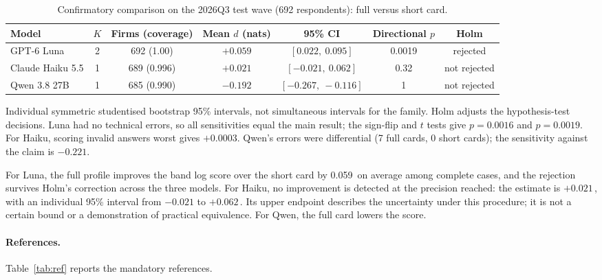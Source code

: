 \documentclass[11pt]{article}
\newcommand{\nats}{\,\text{nats}}
\begin{document}
\begin{table}[ht]
\centering
\begin{threeparttable}
\caption{Confirmatory comparison on the 2026Q3 test wave (692 respondents): full versus short card.}
\label{tab:main}
\small
\setlength{\tabcolsep}{3.5pt}
\begin{tabular*}{\textwidth}{@{\extracolsep{\fill}}lcccccc@{}}
\toprule
Model & $K$ & Firms (coverage) & Mean $d$ (nats) & 95\% CI & Directional $p$ & Holm\\
\midrule
GPT-6 Luna & 2 & 692 (1.00) & $+0.059$ & $[0.022,\ 0.095]$ & 0.0019 & rejected\\
Claude Haiku 5.5 & 1 & 689 (0.996) & $+0.021$ & $[-0.021,\ 0.062]$ & 0.32 & not rejected\\
Qwen 3.8 27B & 1 & 685 (0.990) & $-0.192$ & $[-0.267,\ -0.116]$ & 1 & not rejected\\
\bottomrule
\end{tabular*}
\begin{tablenotes}\footnotesize
\item Individual symmetric studentised bootstrap 95\% intervals, not simultaneous intervals for the family.
Holm adjusts the hypothesis-test decisions. Luna had no technical errors, so all sensitivities equal the main
result; the sign-flip and $t$ tests give $p=0.0016$ and $p=0.0019$. For Haiku, scoring invalid answers worst gives
$+0.0003$. Qwen's errors were differential (7 full cards, 0 short cards); the sensitivity against the claim is
$-0.221$.
\end{tablenotes}
\end{threeparttable}
\end{table}

For Luna, the full profile improves the band log score over the short card by 0.059\nats{} on average among complete
cases, and the rejection survives Holm's correction across the three models. For Haiku, no improvement is detected at
the precision reached: the estimate is $+0.021$\nats{}, with an individual 95\% interval from $-0.021$ to
$+0.062$\nats{}. Its upper endpoint describes the uncertainty under this procedure; it is not a certain bound
or a demonstration of practical equivalence. For Qwen, the full card lowers the score.

\paragraph{References.} Table~\ref{tab:ref} reports the mandatory references.
\end{document}
